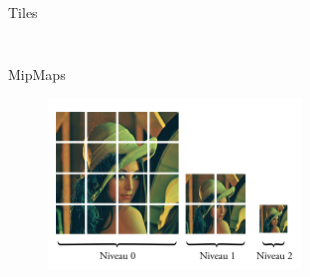 \documentclass[slidetop,compress,mathserif]{beamer}
\begin{document}
\begin{frame}{Tiles}
\begin{columns}
\begin{column}{0.5\textwidth}
\begin{figure}[h]
				\end{figure}
			\end{column}
		\end{columns}
	\end{frame}
	\begin{frame}{MipMaps}
				\begin{figure}[h]
					\includegraphics[width=0.6\textwidth]{images/tile-levels}
				\end{figure}
	\end{frame}
\end{document}
